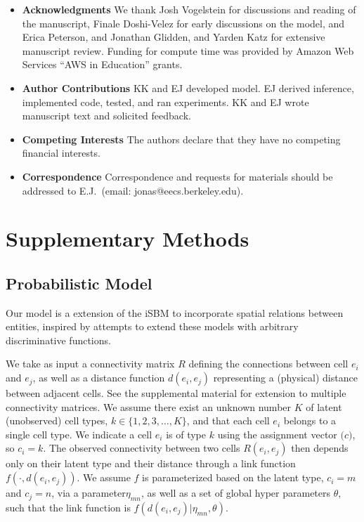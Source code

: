 \documentclass{article}
\renewcommand{\vec}[1]{\mathbf{#1}}
\begin{document}
\begin{itemize}

 \item \textbf{Acknowledgments} We thank Josh Vogelstein for discussions and reading of the manuscript, Finale Doshi-Velez for early discussions on the model, and Erica Peterson, and Jonathan Glidden, and Yarden Katz for extensive manuscript review. Funding for compute time was provided by Amazon Web Services ``AWS in Education'' grants. 
\item \textbf{Author Contributions} KK and EJ developed model. EJ derived inference, implemented code, tested, and ran experiments. KK and EJ wrote manuscript text and solicited feedback. 
 \item \textbf{Competing Interests} The authors declare that they have no
competing financial interests.
 \item \textbf{Correspondence} Correspondence and requests for materials
should be addressed to E.J.~(email: jonas@eecs.berkeley.edu).
\end{itemize}

\newpage
\section*{Supplementary Methods }

\subsection*{Probabilistic Model}

Our model is a extension of the iSBM
\autocite{Kemp2006a,Xu2006} to incorporate spatial relations between entities,
inspired by attempts to extend these models with arbitrary
discriminative functions\autocite{Murphy2012}.

We take as input a connectivity matrix $R$ defining the connections
between cell $e_i$ and $e_j$, as well as a distance function $d(e_i,
e_j)$ representing a (physical) distance between adjacent cells. See
the supplemental material for extension to multiple connectivity
matrices. We assume there exist an unknown number $K$ of latent
(unobserved) cell types, $k \in \{1, 2, 3, \dots, K\}$, and that each
cell $e_i$ belongs to a single cell type. We indicate a cell $e_i$ is
of type $k$ using the assignment vector $\vec(c)$, so $c_i = k$. The
observed connectivity between two cells $R(e_i, e_j)$ then depends
only on their latent type and their distance through a link function
$f(\cdot, d(e_i, e_j))$. We assume $f$ is parameterized based on the
latent type, $c_i=m$ and $c_j=n$, via a parameter$\eta_{mn}$, as well
as a set of global hyper parameters $\theta$, such that the link
function is $f(d(e_i, e_j) | \eta_{mn}, \theta)$. 
\end{document}
